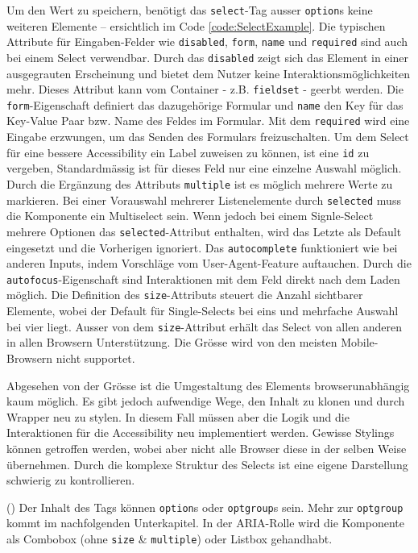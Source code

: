 Um den Wert zu speichern, benötigt das \texttt{select}-Tag ausser \texttt{option}s keine weiteren Elemente – ersichtlich im Code \ref{code:SelectExample}.
Die typischen Attribute für Eingaben-Felder wie \texttt{disabled}, \texttt{form}, \texttt{name} und \texttt{required} sind auch bei einem Select verwendbar.
Durch das \texttt{disabled} zeigt sich das Element in einer ausgegrauten Erscheinung und bietet dem Nutzer keine Interaktionsmöglichkeiten mehr.
Dieses Attribut kann vom Container - z.B. \texttt{fieldset} - geerbt werden.
Die \texttt{form}-Eigenschaft definiert das dazugehörige Formular und \texttt{name} den Key für das Key-Value Paar bzw. Name des Feldes im Formular. 
Mit dem \texttt{required} wird eine Eingabe erzwungen, um das Senden des Formulars freizuschalten.
Um dem Select für eine bessere Accessibility ein Label zuweisen zu können, ist eine \texttt{id} zu vergeben, 
Standardmässig ist für dieses Feld nur eine einzelne Auswahl möglich.
Durch die Ergänzung des Attributs \texttt{multiple} ist es möglich mehrere Werte zu markieren.
Bei einer Vorauswahl mehrerer Listenelemente durch \texttt{selected} muss die Komponente ein Multiselect sein.
Wenn jedoch bei einem Signle-Select mehrere Optionen das \texttt{selected}-Attribut enthalten, wird das Letzte als Default eingesetzt und die Vorherigen ignoriert.
Das \texttt{autocomplete} funktioniert wie bei anderen Inputs, indem Vorschläge vom User-Agent-Feature auftauchen.
Durch die \texttt{autofocus}-Eigenschaft sind Interaktionen mit dem Feld direkt nach dem Laden möglich.
Die Definition des \texttt{size}-Attributs steuert die Anzahl sichtbarer Elemente, wobei der Default für Single-Selects bei eins und mehrfache Auswahl bei vier liegt.
Ausser von dem \texttt{size}-Attribut erhält das Select von allen anderen in allen Browsern Unterstützung.
Die Grösse wird von den meisten Mobile-Browsern nicht supportet.

Abgesehen von der Grösse ist die Umgestaltung des Elements browserunabhängig kaum möglich.
Es gibt jedoch aufwendige Wege, den Inhalt zu klonen und durch Wrapper neu zu stylen.
In diesem Fall müssen aber die Logik und die Interaktionen für die Accessibility neu implementiert werden.
Gewisse Stylings können getroffen werden, wobei aber nicht alle Browser diese in der selben Weise übernehmen.
Durch die komplexe Struktur des Selects ist eine eigene Darstellung schwierig zu kontrollieren.

(\cite{selectMdn}) Der Inhalt des Tags können \texttt{option}s oder \texttt{optgroup}s sein.
Mehr zur \texttt{optgroup} kommt im nachfolgenden Unterkapitel.
In der ARIA-Rolle wird die Komponente als Combobox (ohne \texttt{size} \& \texttt{multiple}) oder Listbox gehandhabt.

